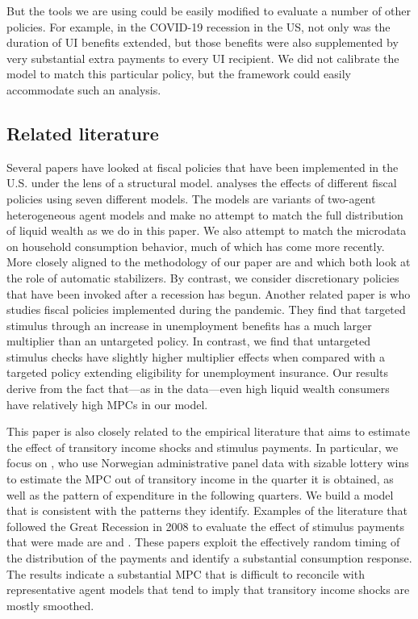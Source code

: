 \documentclass[\econtexRoot/HAFiscal]{subfiles}
\begin{document}
But the tools we are using could be easily modified to evaluate a number of other policies.  For example, in the COVID-19 recession in the US, not only was the duration of UI benefits extended, but those benefits were also supplemented by very substantial extra payments to every UI recipient.  We did not calibrate the model to match this particular policy, but the framework could easily accommodate such an analysis.

\hypertarget{related-literature}{}\par\subsection{Related literature}
\notinsubfile{\label{sec:lit}}

Several papers have looked at fiscal policies that have been implemented in the U.S. under the lens of a structural model. \cite{coenen2012effects} analyses the effects of different fiscal policies using seven different models. The models are variants of two-agent heterogeneous agent models and make no attempt to match the full distribution of liquid wealth as we do in this paper. We also attempt to match the microdata on household consumption behavior, much of which has come more recently.  More closely aligned to the methodology of our paper are \cite{mckay2016role} and \cite{mckay2021optimal} which both look at the role of automatic stabilizers. By contrast, we consider discretionary policies that have been invoked after a recession has begun. Another related paper is \cite{bayercoronavirus} who studies fiscal policies implemented during the pandemic. They find that targeted stimulus through an increase in unemployment benefits has a much larger multiplier than an untargeted policy. In contrast, we find that untargeted stimulus checks have slightly higher multiplier effects when compared with a targeted policy extending eligibility for unemployment insurance. Our results derive from the fact that---as in the data---even high liquid wealth consumers have relatively high MPCs in our model.

This paper is also closely related to the empirical literature that aims to estimate the effect of transitory income shocks and stimulus payments. In particular, we focus on \cite{fagereng_mpc_2021}, who use Norwegian administrative panel data with sizable lottery wins to estimate the MPC out of transitory income in the quarter it is obtained, as well as the pattern of expenditure in the following quarters. We build a model that is consistent with the patterns they identify. Examples of the literature that followed the Great Recession in 2008 to evaluate the effect of stimulus payments that were made are  \cite{parker2013consumer} and \cite{broda2014economic}. These papers exploit the effectively random timing of the distribution of the payments and identify a substantial consumption response. The results indicate a substantial MPC that is difficult to reconcile with representative agent models that tend to imply that transitory income shocks are mostly smoothed. 
\end{document}
